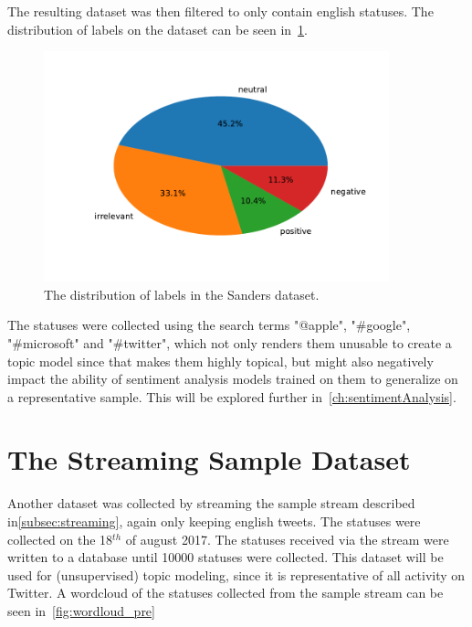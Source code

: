 The resulting dataset was then filtered to only contain english statuses.
The distribution of labels on the dataset can be seen in~\ref{fig:sanders_sentiment}.

\begin{figure}
    \centering
    \caption{The distribution of labels in the Sanders dataset.}
    \label{fig:sanders_sentiment}
    \includegraphics[width=10cm]{../figures/sanders_sentiment.pdf}
\end{figure}

The statuses were collected using the search terms "@apple", "\#google", "\#microsoft" and "\#twitter",
which not only renders them unusable to create a topic model since that makes them highly topical,
but might also negatively impact the ability of sentiment analysis models trained on them to generalize on a representative sample.
This will be explored further in~\ref{ch:sentimentAnalysis}.

\section{The Streaming Sample Dataset}
\label{sec:streamingSampleDataset}

Another dataset was collected by streaming the sample stream described in\ref{subsec:streaming},
again only keeping english tweets.
The statuses were collected on the 18$^{th}$ of august 2017.
The statuses received via the stream were written to a database until 10000 statuses were collected.
This dataset will be used for (unsupervised) topic modeling, since it is representative of all activity on Twitter.
A wordcloud of the statuses collected from the sample stream can be seen in~\ref{fig:wordloud_pre}~

